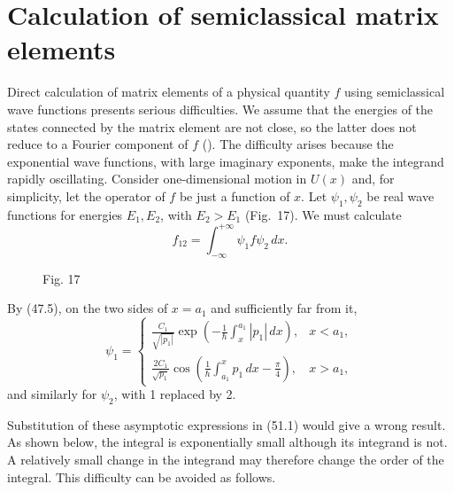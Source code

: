 \section{Calculation of semiclassical matrix elements}

Direct calculation of matrix elements of a physical quantity $f$ using
semiclassical wave functions presents serious difficulties. We assume that
the energies of the states connected by the matrix element are not close, so
the latter does not reduce to a Fourier component of $f$ (). The
difficulty arises because the exponential wave functions, with large
imaginary exponents, make the integrand rapidly oscillating.
Consider one-dimensional motion in $U(x)$ and, for simplicity, let the
operator of $f$ be just a function of $x$. Let $\psi_1,\psi_2$ be real wave
functions for energies $E_1,E_2$, with $E_2>E_1$ (Fig.~17). We must calculate
\begin{equation}
 f_{12}=\int_{-\infty}^{+\infty}\psi_1f\psi_2\,dx. \tag{51.1}
\end{equation}

\begin{figure}[ht]
\centering
{}
\par\smallskip Fig. 17
\end{figure}

By (47.5), on the two sides of $x=a_1$ and sufficiently far from it,
\begin{equation}
 \psi_1=\begin{cases}
 \displaystyle\frac{C_1}{\sqrt{|p_1|}}
 \exp\left(-\frac1\hbar\int_x^{a_1}|p_1|\,dx\right),&x<a_1,\\[6pt]
 \displaystyle\frac{2C_1}{\sqrt{p_1}}
 \cos\left(\frac1\hbar\int_{a_1}^x p_1\,dx-\frac\pi4\right),&x>a_1,
 \end{cases} \tag{51.2}
\end{equation}
and similarly for $\psi_2$, with 1 replaced by 2.

Substitution of these asymptotic expressions in (51.1) would give a wrong
result. As shown below, the integral is exponentially small although its
integrand is not. A relatively small change in the integrand may therefore
change the order of the integral. This difficulty can be avoided as follows.


